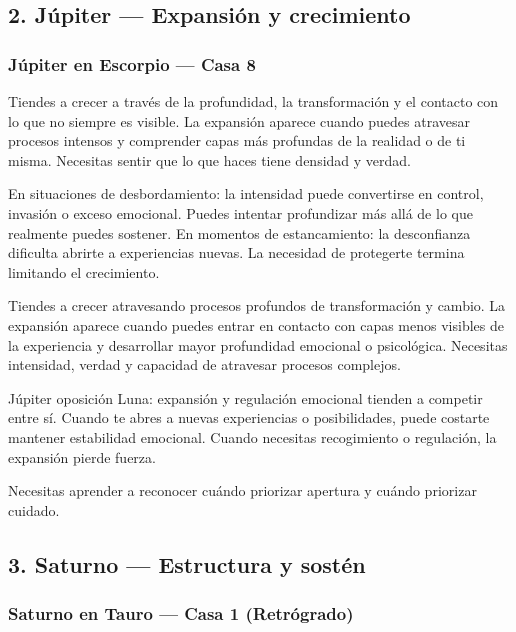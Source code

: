 \documentclass[11pt,a4paper]{article}
\begin{document}
\subsection{2. Júpiter — Expansión y crecimiento}

\subsubsection*{
Júpiter en Escorpio
— Casa 8
}

Tiendes a crecer a través de la profundidad, la transformación y el contacto con lo que no siempre es visible. La expansión aparece cuando puedes atravesar procesos intensos y comprender capas más profundas de la realidad o de ti misma. Necesitas sentir que lo que haces tiene densidad y verdad.

En situaciones de desbordamiento: la intensidad puede convertirse en control, invasión o exceso emocional. Puedes intentar profundizar más allá de lo que realmente puedes sostener. En momentos de estancamiento: la desconfianza dificulta abrirte a experiencias nuevas. La necesidad de protegerte termina limitando el crecimiento.

Tiendes a crecer atravesando procesos profundos de transformación y cambio. La expansión aparece cuando puedes entrar en contacto con capas menos visibles de la experiencia y desarrollar mayor profundidad emocional o psicológica. Necesitas intensidad, verdad y capacidad de atravesar procesos complejos.

Júpiter oposición Luna: expansión y regulación emocional tienden a competir entre sí. Cuando te abres a nuevas experiencias o posibilidades, puede costarte mantener estabilidad emocional. Cuando necesitas recogimiento o regulación, la expansión pierde fuerza.

Necesitas aprender a reconocer cuándo priorizar apertura y cuándo priorizar cuidado.

\vspace{0.8cm}


\subsection{3. Saturno — Estructura y sostén}

\subsubsection*{
Saturno en Tauro
— Casa 1 (Retrógrado)
}
\end{document}
